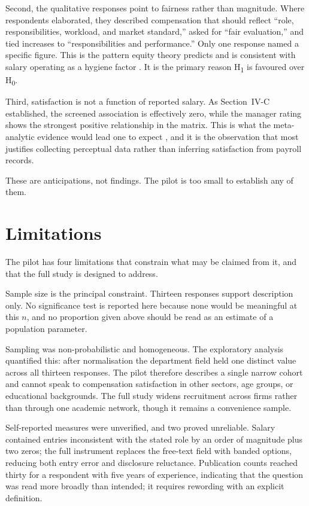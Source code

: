 \documentclass[conference]{IEEEtran}
\begin{document}
Second, the qualitative responses point to fairness rather than
magnitude. Where respondents elaborated, they described compensation
that should reflect ``role, responsibilities, workload, and market
standard,'' asked for ``fair evaluation,'' and tied increases to
``responsibilities and performance.'' Only one response named a specific
figure. This is the pattern equity theory predicts
\cite{adams1963inequity} and is consistent with salary operating as a
hygiene factor \cite{herzberg1959motivation}. It is the primary reason
H\textsubscript{1} is favoured over H\textsubscript{0}.

Third, satisfaction is not a function of reported salary. As
Section~IV-C established, the screened association is effectively zero,
while the manager rating shows the strongest positive relationship in the
matrix. This is what the meta-analytic evidence would lead one to expect
\cite{williams2006meta}, and it is the observation that most justifies
collecting perceptual data rather than inferring satisfaction from
payroll records.

These are anticipations, not findings. The pilot is too small to
establish any of them.

\section{Limitations}

The pilot has four limitations that constrain what may be claimed from
it, and that the full study is designed to address.

Sample size is the principal constraint. Thirteen responses support
description only. No significance test is reported here because none
would be meaningful at this $n$, and no proportion given above should be
read as an estimate of a population parameter.

Sampling was non-probabilistic and homogeneous. The exploratory analysis
quantified this: after normalisation the department field held one
distinct value across all thirteen responses. The pilot therefore
describes a single narrow cohort and cannot speak to compensation
satisfaction in other sectors, age groups, or educational backgrounds.
The full study widens recruitment across firms rather than through one
academic network, though it remains a convenience sample.

Self-reported measures were unverified, and two proved unreliable.
Salary contained entries inconsistent with the stated role by an order of
magnitude plus two zeros; the full instrument replaces the free-text
field with banded options, reducing both entry error and disclosure
reluctance. Publication counts reached thirty for a respondent with five
years of experience, indicating that the question was read more broadly
than intended; it requires rewording with an explicit definition.
\end{document}
